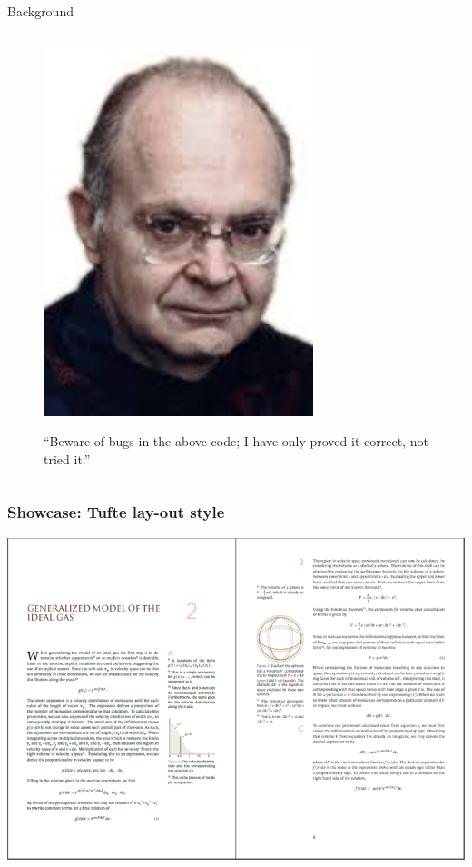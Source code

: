 \documentclass[ignorenonframetext]{beamer}
\begin{document}
\begin{frame}[fragile]{Background}
\begin{columns}
    \begin{column}{.5\textwidth}
      \begin{figure}[h]
        \centering
        \includegraphics[width = 0.7\textwidth]{knuth}
        \newline
        \begin{footnotesize}
        ``Beware of bugs in the above code; I have only proved it correct, not tried it.''
        \end{footnotesize}
        \end{figure}
    \end{column}
  \end{columns}
\end{frame}

\begin{frame}[fragile]
  \frametitle{Showcase: Tufte lay-out style}
  \includegraphics[width = 1.0\textwidth]{tufte}
\end{frame}
\end{document}

